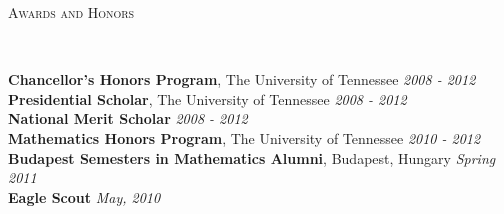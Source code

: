 \documentclass[9pt]{article}
\newenvironment{changemargin}[2]{%
  \begin{list}{}{%
    \setlength{\topsep}{0pt}%
    \setlength{\leftmargin}{#1}%
    \setlength{\rightmargin}{#2}%
    \setlength{\listparindent}{\parindent}%
    \setlength{\itemindent}{\parindent}%
    \setlength{\parsep}{\parskip}%
  }%
  \item[]}{\end{list}
}
\newcommand{\lineover}{
	\begin{changemargin}{-0.05in}{-0.05in}
		\vspace*{-8pt}
		\hrulefill \\
		\vspace*{-2pt}
	\end{changemargin}
}
\newcommand{\header}[1]{
	\begin{changemargin}{-0.5in}{-0.5in}
		\scshape{#1}\\
  	\lineover
	\end{changemargin}
}
\newenvironment{body} {
	\vspace*{-16pt}
	\begin{changemargin}{-0.25in}{-0.5in}
  }	
	{\end{changemargin}
}
\begin{document}
\smallskip


\header{Awards and Honors}

\begin{body}
	\vspace{14pt}
	\textbf{Chancellor's Honors Program}, The University of Tennessee \hfill{} \emph{2008 - 2012}\\
	\smallskip
	\textbf{Presidential Scholar}, The University of Tennessee \hfill{} \emph{2008 - 2012} \\
	\smallskip
	\textbf{National Merit Scholar} \hfill{} \emph{2008 - 2012} \\
	\smallskip
	\textbf{Mathematics Honors Program}, The University of Tennessee \hfill{} \emph{2010 - 2012} \\
	\smallskip
	\textbf{Budapest Semesters in Mathematics Alumni}, Budapest, Hungary \hfill{} \emph{Spring 2011} \\
	\smallskip
	\textbf{Eagle Scout} \hfill{} \emph{May, 2010}
\end{body}
\end{document}
